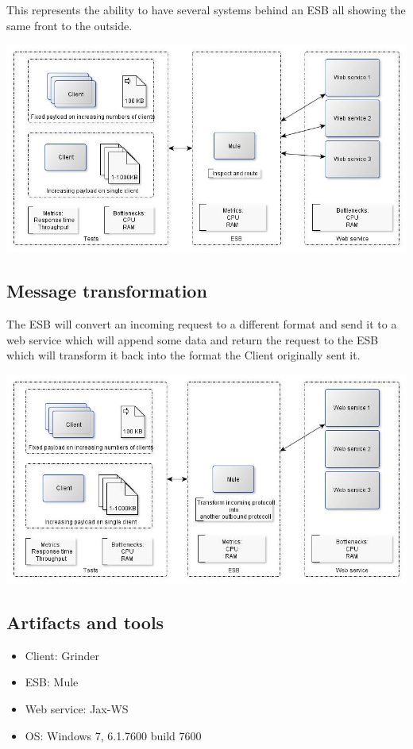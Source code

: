 This represents the ability to have several systems behind an ESB all showing the same front to the outside.

\centerline{\includegraphics[scale=0.43]{img/Routing}}
\subsection{Message transformation}
The ESB will convert an incoming request to a different format and send it to a web service which will append some data and return the request to the ESB which will transform it back into the format the Client originally sent it.

\centerline{\includegraphics[scale=0.43]{img/transformation}}
\subsection{Artifacts and tools}
\begin{itemize}
	\item Client: Grinder \cite{whatisgrinder, kod}
	\item ESB: Mule \cite{whatismule, kod}
	\item Web service: Jax-WS \cite{whatisjaxws, kod}
	\item OS: Windows 7, 6.1.7600 build 7600
\end{itemize}

